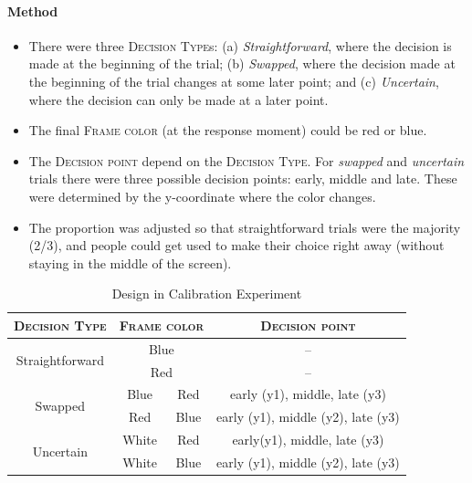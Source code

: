 \documentclass{article}
\begin{document}
\paragraph{Method}

\begin{itemize}
\item There were three \textsc{Decision Type}s: (a) \textit{Straightforward}, where the decision is made at the beginning of the trial; (b) \textit{Swapped}, where the decision made at the beginning of the trial changes at some later point; and (c) \textit{Uncertain}, where the decision can only be made at a later point.  
\item The final \textsc{Frame color} (at the response moment) could be red or blue. 
\item The \textsc{Decision point} depend on the \textsc{Decision Type}. For \textit{swapped} and \textit{uncertain} trials there were three possible decision points: early, middle and late. These were determined by the y-coordinate where the color changes. 
\item The proportion was adjusted so that straightforward trials were the majority  (2/3), and people could get used to make their choice right away (without staying in the middle of the screen).
\end{itemize}

\begin{table}[!h]
\centering
\begin{tabular}{cccc}
\textsc{Decision Type}&\multicolumn{2}{c}{\textsc{Frame color}}&\textsc{Decision point}\\
\hline
\multirow{2}{*}{Straightforward} & \multicolumn{2}{c}{\cellcolor{blue} Blue} & -- \\
& \multicolumn{2}{c}{\cellcolor{red} Red} & -- \\
\hline
\multirow{2}{*}{Swapped} & \cellcolor{blue}Blue & \cellcolor{red} Red & early (y1), middle, late (y3) \\
 & \cellcolor{red} Red & \cellcolor{blue} Blue & early (y1), middle (y2), late (y3) \\
\hline
\multirow{2}{*}{Uncertain} & White & \cellcolor{red} Red & early(y1), middle, late (y3)\\
 & White & \cellcolor{blue} Blue & early (y1), middle (y2), late (y3) \\
\hline

\end{tabular}
\caption{Design in Calibration Experiment}
\end{table}
\end{document}
